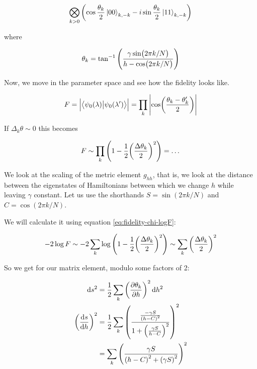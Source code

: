 \documentclass[main.tex]{subfiles}
\begin{document}
\begin{equation}
    \bigotimes _{k>0}\qty( \cos \frac{\theta_k}{2} \ket{00}_{k, -k} - i \sin \frac{\theta_k}{2} \ket{11}_{k, -k} )
\end{equation}

where

\begin{equation}
    \theta_k = \tan ^{-1} \qty(\frac{\gamma \sin (2 \pi k /N)}{h - \cos (2 \pi k /N)})
\end{equation}

Now, we move in the parameter space and see how the fidelity looks like.

\begin{equation}
    F = \abs{\braket{\psi_0 (\lambda)}{\psi_0 (\lambda')} } = \prod _k \abs{\cos(\frac{\theta_k - \theta_k '}{2})}
\end{equation}

If \(\Delta_k \theta \sim 0\) this becomes

\begin{equation}
    F \sim \prod_k \qty(1 - \frac{1}{2} \qty(\frac{\Delta \theta_k}{2})^2) = \dots
\end{equation}

We look at the scaling of the metric element \(g _{hh} \), that is, we look at the distance between the eigenstates of Hamiltonians between which we change \(h\) while leaving \(\gamma\) constant. Let us use the shorthands \(S = \sin(2 \pi k /N)\) and \(C = \cos(2 \pi k /N)\).

We will calculate it using equation \eqref{eq:fidelity-chi-logF}:

\begin{equation}
    -2 \log F \sim -2 \sum_k \log \qty(1 - \frac{1}{2}\qty(\frac{\Delta \theta_k}{2})^2)
    \sim \sum_k \qty(\frac{\Delta \theta_k}{2})^2
\end{equation}

So we get for our matrix element, modulo some factors of 2:

\begin{subequations}
\begin{align}
    \dd{s^2} &= \frac{1}{2} \sum _{k}  \qty(\pdv{\theta_k}{h})^2 \dd{h^2}  \\
    \qty(\dv{s}{h})^2 &= \frac{1}{2} \sum _{k}
    \qty(\frac{\frac{-\gamma S}{\qty(h - C)^2}}{1 + \qty(\frac{\gamma S}{h - C})^2})^2  \\
    &= \sum _{k} \qty( \frac{\gamma S}{\qty(h - C)^2 + \qty(\gamma S)^2})^2
\end{align}
\end{subequations}
\end{document}
